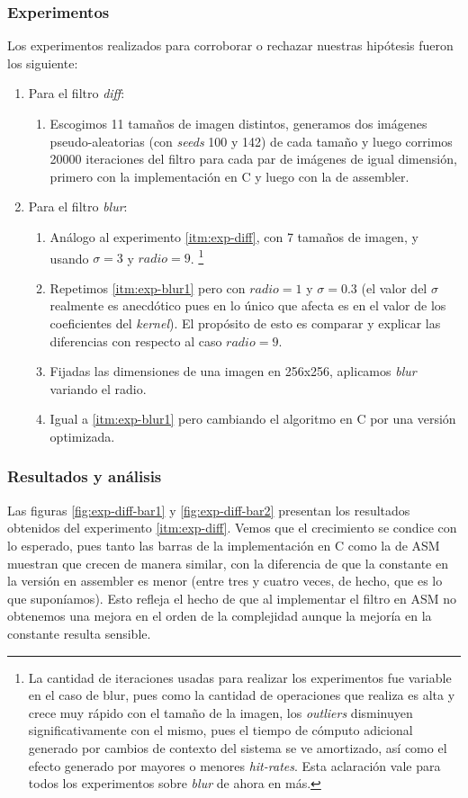 \subsubsection{Experimentos}
Los experimentos realizados para corroborar o rechazar nuestras hipótesis fueron los siguiente:
\begin{enumerate}
	\item Para el filtro \emph{diff}: 
		\begin{enumerate}
			\item \label{itm:exp-diff} Escogimos 11 tamaños de imagen distintos, generamos dos imágenes pseudo-aleatorias (con \emph{seeds} 100 y 142) de cada tamaño y luego corrimos 20000 iteraciones del filtro para cada par de imágenes de igual dimensión, primero con la implementación en C y luego con la de assembler.
		\end{enumerate}
	\item Para el filtro \emph{blur}:
		\begin{enumerate}
			\item \label{itm:exp-blur1}Análogo al experimento \ref{itm:exp-diff}, con 7 tamaños de imagen, y usando $\sigma=3$ y $radio=9$. \footnote{La cantidad de iteraciones usadas para realizar los experimentos fue variable en el caso de blur, pues como la cantidad de operaciones que realiza es alta y crece muy rápido con el tamaño de la imagen, los \emph{outliers} disminuyen significativamente con el mismo, pues el tiempo de cómputo adicional generado por cambios de contexto del sistema se ve amortizado, así como el efecto generado por mayores o menores \emph{hit-rates}. Esta aclaración vale para todos los experimentos sobre \emph{blur} de ahora en más.}
			\item Repetimos \ref{itm:exp-blur1} pero con $radio = 1$ y $\sigma = 0.3$ (el valor del $\sigma$ realmente es anecdótico pues en lo único que afecta es en el valor de los coeficientes del \emph{kernel}). El propósito de esto es comparar y explicar las diferencias con respecto al caso $radio = 9$.
			\item Fijadas las dimensiones de una imagen en 256x256, aplicamos \emph{blur} variando el radio.
			\item Igual a \ref{itm:exp-blur1} pero cambiando el algoritmo en C por una versión optimizada.
		\end{enumerate}
\end{enumerate}

\subsubsection{Resultados y análisis}
Las figuras \ref{fig:exp-diff-bar1} y \ref{fig:exp-diff-bar2} presentan los resultados obtenidos del experimento \ref{itm:exp-diff}. Vemos que el crecimiento se condice con lo esperado, pues tanto las barras de la implementación en C como la de ASM muestran que crecen de manera similar, con la diferencia de que la constante en la versión en assembler es menor (entre tres y cuatro veces, de hecho, que es lo que suponíamos). Esto refleja el hecho de que al implementar el filtro en ASM no obtenemos una mejora en el orden de la complejidad aunque la mejoría en la constante resulta sensible.

